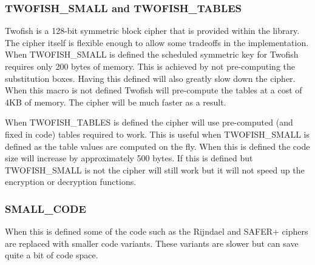 \documentclass{book}
\begin{document}
\subsubsection{TWOFISH\_SMALL and TWOFISH\_TABLES}
Twofish is a 128-bit symmetric block cipher that is provided within the library.  The cipher itself is flexible enough
to allow some tradeoffs in the implementation.  When TWOFISH\_SMALL is defined the scheduled symmetric key for Twofish 
requires only 200 bytes of memory.  This is achieved by not pre-computing the substitution boxes.  Having this 
defined will also greatly slow down the cipher.  When this macro is not defined Twofish will pre-compute the 
tables at a cost of 4KB of memory.  The cipher will be much faster as a result.  

When TWOFISH\_TABLES is defined the cipher will use pre-computed (and fixed in code) tables required to work.  This is
useful when TWOFISH\_SMALL is defined as the table values are computed on the fly.  When this is defined the code size
will increase by approximately 500 bytes.  If this is defined but TWOFISH\_SMALL is not the cipher will still work but
it will not speed up the encryption or decryption functions.

\subsubsection{SMALL\_CODE}
When this is defined some of the code such as the Rijndael and SAFER+ ciphers are replaced with smaller code variants.
These variants are slower but can save quite a bit of code space.
\end{document}
